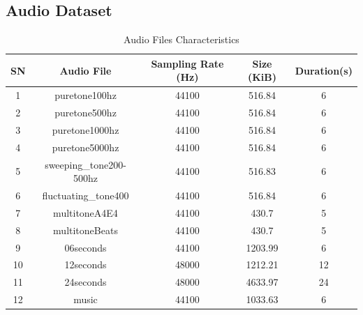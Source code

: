 \documentclass{ioereport}
\begin{document}
\subsection{Audio Dataset}
\begin{table}[H]
\centering
\caption{Audio Files Characteristics}
\label{tab:audio_files}
\begin{tabular}{|c|c|c|c|c|}
    \hline
    \textbf{SN} & \textbf{Audio File} & \textbf{Sampling Rate (Hz)} & \textbf{Size (KiB)} & \textbf{Duration(s)}\\
    \hline
    1 & puretone100hz & 44100 & 516.84 & 6 \\
    \hline
    2 & puretone500hz & 44100 & 516.84 & 6 \\
    \hline
    3 & puretone1000hz & 44100 & 516.84 & 6 \\
    \hline
    4 & puretone5000hz & 44100 & 516.84 & 6 \\
    \hline
    5 & sweeping\_tone200-500hz & 44100 & 516.83 & 6 \\
    \hline
    6 & fluctuating\_tone400 & 44100 & 516.84 & 6 \\
    \hline
    7 & multitoneA4E4 & 44100 & 430.7 & 5\\
    \hline
    8 & multitoneBeats & 44100 & 430.7 & 5\\ 
    \hline
    9 & 06seconds & 44100 & 1203.99 & 6\\
    \hline
    10 & 12seconds & 48000 & 1212.21 & 12\\
    \hline
    11 & 24seconds & 48000 & 4633.97 & 24  \\
    \hline
    12 & music & 44100 & 1033.63 & 6 \\
    \hline
\end{tabular}
\end{table}
\end{document}
